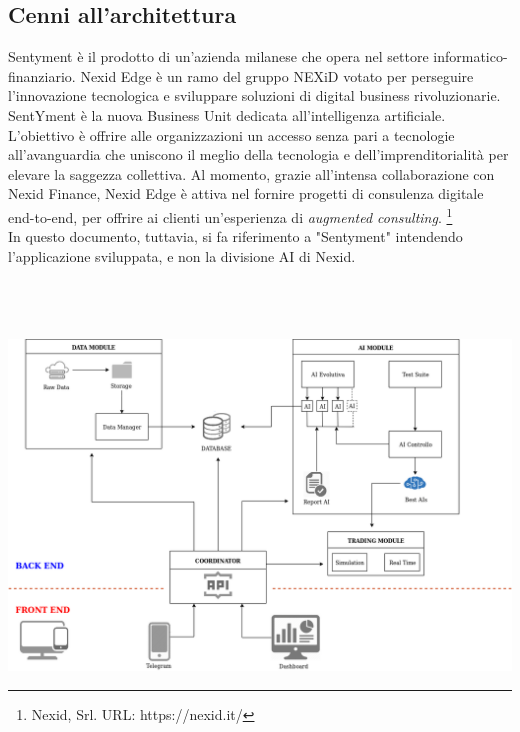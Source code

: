 \documentclass[a4paper,12pt]{report}
\begin{document}
\subsection{Cenni all'architettura}
Sentyment è il prodotto di un'azienda milanese che opera nel settore informatico-finanziario. Nexid Edge è un ramo del gruppo NEXiD votato per perseguire l'innovazione tecnologica e sviluppare soluzioni di digital business rivoluzionarie. SentYment è la nuova Business Unit dedicata all'intelligenza artificiale.\\
L'obiettivo è offrire alle organizzazioni un accesso senza pari a tecnologie all'avanguardia che uniscono il meglio della tecnologia e dell'imprenditorialità per elevare la saggezza collettiva. Al momento, grazie all'intensa collaborazione con Nexid Finance, Nexid Edge è attiva nel fornire progetti di consulenza digitale end-to-end, per offrire ai clienti un'esperienza di \textit{augmented consulting}. \footnote{Nexid, Srl. URL: https://nexid.it/}\\
In questo documento, tuttavia, si fa riferimento a "Sentyment" intendendo l'applicazione sviluppata, e non la divisione AI di Nexid.\\~\\\\~\\
	\begin{fig}
	\includegraphics[width=\linewidth]{Sentyment}
	\label{Figura 10}
\end{fig}
\end{document}
